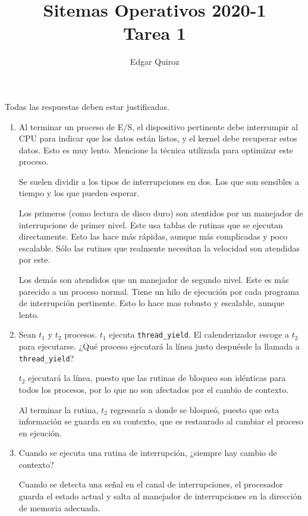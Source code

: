 \documentclass{article}
\title{
    Sitemas Operativos 2020-1\\
    Tarea 1
}
\author{
    Edgar Quiroz
}
\begin{document}
    \maketitle

    Todas las respuestas deben estar justificadas.

    \begin{enumerate}
        \item Al terminar un proceso de E/S, el dispositivo pertinente debe 
        interrumpir al CPU para indicar que los datos están listos, y el kernel
        debe recuperar estos datos. Esto es muy lento. Mencione la técnica 
        utilizada para optimizar este proceso.

        Se suelen dividir a los tipos de interrupciones en dos. Los que son
        sensibles a tiempo y los que pueden esperar.

        Los primeros (como lectura de disco duro) son atentidos por un manejador
        de interrupcione de primer nivel. Este usa tablas de rutinas que se 
        ejecutan directamente. Esto las hace más rápidas, aunque más 
        complicadas y poco escalable. Sólo las rutines que realmente necesitan 
        la velocidad son atendidas por este.

        Los demás son atendidos que un manejador de segundo nivel. Este es más 
        parecido a un proceso normal. Tiene un hilo de ejecución por cada
        programa de interrupción pertinente. Esto lo hace mas robusto y 
        escalable, aunque lento.

        \item Sean $t_1$ y $t_2$ procesos. $t_1$ ejecuta \texttt{thread\_yield}.
        El calenderizador escoge a $t_2$ para ejecutarse. ¿Qué proceso ejecutará 
        la línea justo despuésde la llamada a \texttt{thread\_yield}?

        $t_2$ ejecutará la línea, puesto que las rutinas de bloqueo son 
        idénticas para todos los procesos, por lo que no son afectados por el 
        cambio de contexto. 
        
        Al terminar la rutina, $t_2$ regresaría a donde se bloqueó, puesto que 
        esta información se guarda en su contexto, que es restaurado al cambiar 
        el proceso en ejeución.

        \item Cuando se ejecuta una rutina de interrupción, ¿siempre hay cambio
        de contexto?

        Cuando se detecta una señal en el canal de interrupciones, el procesador
        guarda el estado actual y salta al manejador de interrupciones 
        en la dirección de memoria adecuada.


\end{enumerate}
\end{document}
